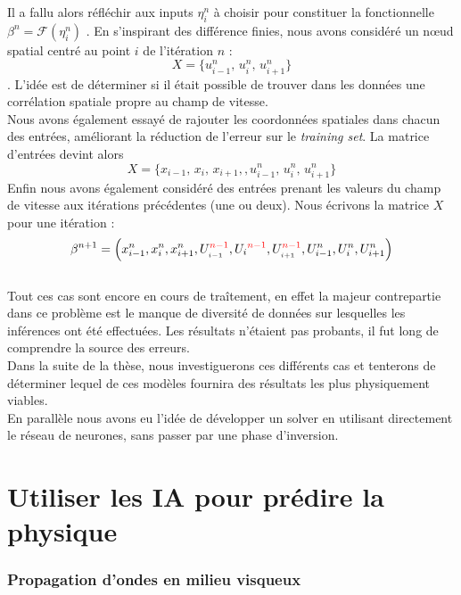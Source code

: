 \documentclass[a4paper,12pt]{article}
\newcommand{\bepar}[1]{
	\left( #1 \right)  
}
\newcommand\bk{\color{black}}
\newcommand\brick{\color{brick}}
\newcommand\navy{\color{navy}}
\newcommand\red{\color{red}}
\numberwithin{equation}{section} %
\begin{document}
\noindent Il a fallu alors réfléchir aux inputs $\eta_i^n$ à choisir pour constituer la fonctionnelle $\beta^n = \mathcal{F}\bepar{\eta_i^n}$ . En s'inspirant des différence finies, nous avons considéré un nœud spatial centré au point $i$ de l'itération $n$ : $$X = \{ u^n_{i-1},\, u^n_{i},\, u^n_{i+1}\}$$. L'idée est de déterminer si il était possible de trouver dans les données une corrélation spatiale propre au champ de vitesse.\\
Nous avons également essayé de rajouter les coordonnées spatiales dans chacun des entrées, améliorant la réduction de l'erreur sur le \textit{training set}. La matrice d'entrées devint alors $$X = \{ x_{i-1}, \, x_i,\, x_{i+1},, u^n_{i-1},\, u^n_{i},\, u^n_{i+1}\}$$
Enfin nous avons également considéré des entrées prenant les valeurs du champ de vitesse aux itérations précédentes (une ou deux). Nous écrivons la matrice $X$ pour une itération : $$ \beta^{n+1} = \bepar{x_{i-1}^n, x_i^n, x^n_{i+1}, U_{_{\bk i-1}}^{\red n-1}, U_{\bk i}^{\red n-1}, U_{_{\bk i+1}}^{\red n-1}, U_{i-1}^n, U_i^n, U^n_{i+1}} $$\\
Tout ces cas sont encore en cours de traîtement, en effet la majeur contrepartie dans ce problème est le manque de diversité de données sur lesquelles les inférences ont été effectuées. Les résultats n'étaient pas probants, il fut long de comprendre la source des erreurs. \\
Dans la suite de la thèse, nous investiguerons ces différents cas et tenterons de déterminer lequel de ces modèles fournira des résultats les plus physiquement viables.\\
En parallèle nous avons eu l'idée de développer un solver en utilisant directement le réseau de neurones, sans passer par une phase d'inversion.\\


\navy \section{Utiliser les IA pour prédire la physique} \bk
\brick \subsubsection{Propagation d'ondes en milieu visqueux}\bk

\pagebreak
\end{document}
